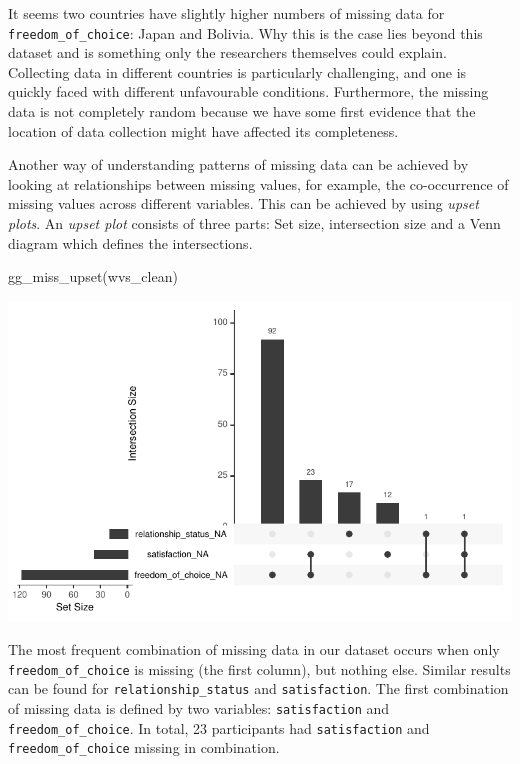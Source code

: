 \documentclass[
  letterpaper,
  DIV=11,
  numbers=noendperiod]{scrreprt}
\newenvironment{Shaded}{\begin{snugshade}}{\end{snugshade}}
\newcommand{\FunctionTok}[1]{\textcolor[rgb]{0.28,0.35,0.67}{#1}}
\newcommand{\NormalTok}[1]{\textcolor[rgb]{0.00,0.23,0.31}{#1}}
\begin{document}
It seems two countries have slightly higher numbers of missing data for
\texttt{freedom\_of\_choice}: Japan and Bolivia. Why this is the case
lies beyond this dataset and is something only the researchers
themselves could explain. Collecting data in different countries is
particularly challenging, and one is quickly faced with different
unfavourable conditions. Furthermore, the missing data is not completely
random because we have some first evidence that the location of data
collection might have affected its completeness.

Another way of understanding patterns of missing data can be achieved by
looking at relationships between missing values, for example, the
co-occurrence of missing values across different variables. This can be
achieved by using \emph{upset plots}. An \emph{upset plot} consists of
three parts: Set size, intersection size and a Venn diagram which
defines the intersections.

\begin{Shaded}
\begin{Highlighting}[]
\FunctionTok{gg\_miss\_upset}\NormalTok{(wvs\_clean)}
\end{Highlighting}
\end{Shaded}

\includegraphics{07_data_wrangling_files/figure-pdf/upset-plot-1.pdf}

The most frequent combination of missing data in our dataset occurs when
only \texttt{freedom\_of\_choice} is missing (the first column), but
nothing else. Similar results can be found for
\texttt{relationship\_status} and \texttt{satisfaction}. The first
combination of missing data is defined by two variables:
\texttt{satisfaction} and \texttt{freedom\_of\_choice}. In total, 23
participants had \texttt{satisfaction} and \texttt{freedom\_of\_choice}
missing in combination.
\end{document}
